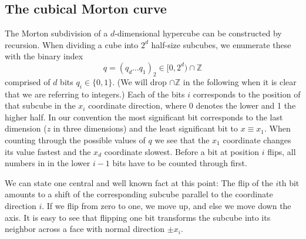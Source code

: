 \documentclass[a4paper,11pt]{article}
\newcommand{\sZ}{\mathbb{Z}}
\newcommand{\eqnlab}[1]{\label{eqn:#1}}
\newcommand{\seclab}[1]{\label{sec:#1}}
\begin{document}
\subsection{The cubical Morton curve}
\seclab{concepts-cubical}

The Morton subdivision of a $d$-dimensional hypercube \cite{Morton66} can be
constructed by recursion.  When dividing a cube into $2^d$ half-size subcubes,
we enumerate these with the binary index
\begin{equation}
  \eqnlab{onelevel}
  q = (q_d \ldots q_1)_2 \in [0, 2^d) \cap \sZ
\end{equation}
comprised of $d$ bits $q_i \in \{ 0, 1 \}$.  (We will drop $\cap \sZ$ in the
following when it is clear that we are referring to integers.)
Each of the bits $i$ corresponds to the position of that subcube in the $x_i$
coordinate direction, where 0 denotes the lower and 1 the higher half.  In
our convention the most significant bit corresponds to the last dimension ($z$
in three dimensions) and the least significant bit to $x \equiv x_1$.
When counting through the possible values of $q$ we see that the $x_1$
coordinate changes its value fastest and the $x_d$ coordinate slowest.  Before
a bit at position $i$ flips, all numbers in in the lower $i-1$ bits have to be
counted through first.

We can state one central and well known fact at this point: The flip of the
$i$th bit amounts to a shift of the corresponding subcube parallel to the
coordinate direction $i$.  If we flip from zero to one, we move up, and else we
move down the axis.  It is easy to see that flipping one bit transforms the
subcube into its neighbor across a face with normal direction $\pm x_i$.
\end{document}
